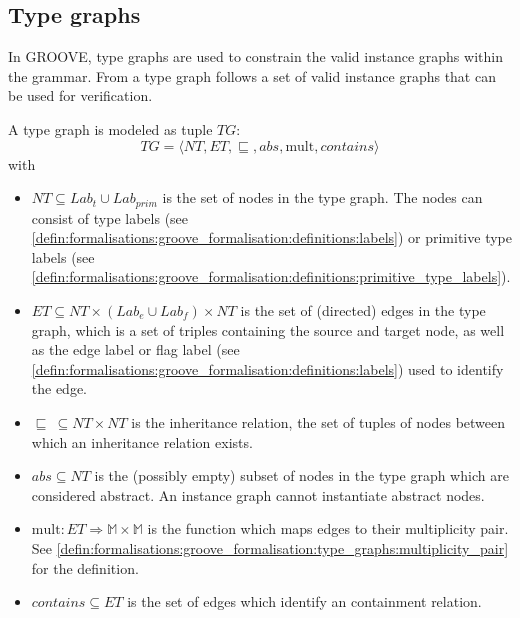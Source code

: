 \subsection{Type graphs}
\label{subsec:formalisations:groove_formalisation:type_graphs}

In GROOVE, type graphs are used to constrain the valid instance graphs within the grammar. From a type graph follows a set of valid instance graphs that can be used for verification.

\begin{defin}
\label{defin:formalisations:groove_formalisation:type_graphs:type_graph}
A type graph is modeled as tuple $TG$:
\begin{equation}
    TG = \langle NT, ET, \sqsubseteq, abs, \mathrm{mult}, contains \rangle
\end{equation}
with
\begin{itemize}
    \item $NT \subseteq Lab_t \cup Lab_{prim}$ is the set of nodes in the type graph. The nodes can consist of type labels (see \cref{defin:formalisations:groove_formalisation:definitions:labels}) or primitive type labels (see \cref{defin:formalisations:groove_formalisation:definitions:primitive_type_labels}).
    
    \item $ET \subseteq NT \times (Lab_e \cup Lab_f) \times NT$ is the set of (directed) edges in the type graph, which is a set of triples containing the source and target node, as well as the edge label or flag label (see \cref{defin:formalisations:groove_formalisation:definitions:labels}) used to identify the edge.
    
    \item $\sqsubseteq\ \subseteq NT \times NT$ is the inheritance relation, the set of tuples of nodes between which an inheritance relation exists.
    
    \item $abs \subseteq NT$ is the (possibly empty) subset of nodes in the type graph which are considered abstract. An instance graph cannot instantiate abstract nodes.
    
    \item $\mathrm{mult}: ET \Rightarrow \mathbb{M} \times \mathbb{M}$ is the function which maps edges to their multiplicity pair. See \cref{defin:formalisations:groove_formalisation:type_graphs:multiplicity_pair} for the definition.
    
    \item $contains \subseteq ET$ is the set of edges which identify an containment relation. 
\end{itemize}

\end{defin}

